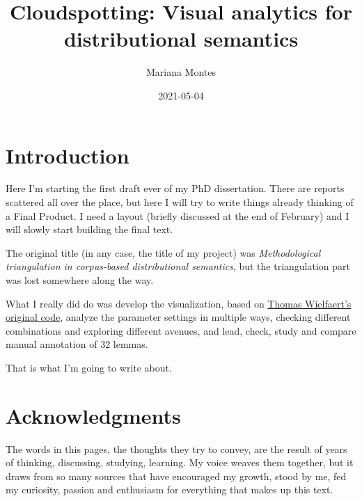 \documentclass[
]{book}
\title{Cloudspotting: Visual analytics for distributional semantics}
\author{Mariana Montes}
\date{2021-05-04}
\newenvironment{Shaded}{\begin{snugshade}}{\end{snugshade}}
\newcommand{\AttributeTok}[1]{\textcolor[rgb]{0.77,0.63,0.00}{#1}}
\newcommand{\ConstantTok}[1]{\textcolor[rgb]{0.00,0.00,0.00}{#1}}
\newcommand{\FunctionTok}[1]{\textcolor[rgb]{0.00,0.00,0.00}{#1}}
\newcommand{\NormalTok}[1]{#1}
\newcommand{\SpecialCharTok}[1]{\textcolor[rgb]{0.00,0.00,0.00}{#1}}
\begin{document}
\maketitle

{
\setcounter{tocdepth}{1}
\tableofcontents
}
\begin{Shaded}
\end{Shaded}

\hypertarget{introduction}{%
\chapter*{Introduction}\label{introduction}}

Here I'm starting the first draft ever of my PhD dissertation.
There are reports scattered all over the place, but here I will try to write things already
thinking of a Final Product. I need a layout (briefly discussed at the end of February) and
I will slowly start building the final text.

The original title (in any case, the title of my project) was
\emph{Methodological triangulation in corpus-based distributional semantics},
but the triangulation part was lost somewhere along the way.

What I really did do was develop the visualization,
based on \href{https://github.com/tokenclouds/tokenclouds.github.io}{Thomas Wielfaert's original code},
analyze the parameter settings in multiple ways,
checking different combinations and exploring different avenues,
and lead, check, study and compare manual annotation of 32 lemmas.

That is what I'm going to write about.

\hypertarget{acknowledgments}{%
\chapter*{Acknowledgments}\label{acknowledgments}}

The words in this pages, the thoughts they try to convey, are the result of
years of thinking, discussing, studying, learning. My voice weaves them together,
but it draws from so many sources that have encouraged my growth, stood by me,
fed my curiosity, passion and enthusiasm for everything that makes up this text.
\end{document}
